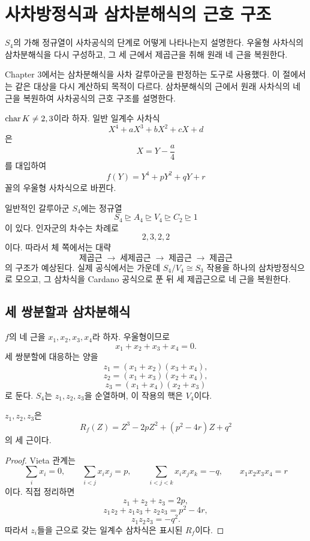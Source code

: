 \clearpage
\section{사차방정식과 삼차분해식의 근호 구조}
\label{sec:quartic-radical-structure}

\begin{learninggoal}
$S_4$의 가해 정규열이 사차공식의 단계로 어떻게 나타나는지 설명한다. 우울형 사차식의 삼차분해식을 다시 구성하고, 그 세 근에서 제곱근을 취해 원래 네 근을 복원한다.
\end{learninggoal}

Chapter 3에서는 삼차분해식을 사차 갈루아군을 판정하는 도구로 사용했다. 이 절에서는 같은 대상을 다시 계산하되 목적이 다르다. 삼차분해식의 근에서 원래 사차식의 네 근을 복원하여 사차공식의 근호 구조를 설명한다.

$\operatorname{char} K\ne2,3$이라 하자. 일반 일계수 사차식
\[
  X^4+aX^3+bX^2+cX+d
\]
은
\[
  X=Y-\frac a4
\]
를 대입하여
\[
  f(Y)=Y^4+pY^2+qY+r
\]
꼴의 우울형 사차식으로 바뀐다.

일반적인 갈루아군 $S_4$에는 정규열
\[
  S_4\trianglerighteq A_4\trianglerighteq V_4
  \trianglerighteq C_2\trianglerighteq1
\]
이 있다. 인자군의 차수는 차례로
\[
  2,3,2,2
\]
이다. 따라서 체 쪽에서는 대략
\[
  \text{제곱근}\;\longrightarrow\;
  \text{세제곱근}\;\longrightarrow\;
  \text{제곱근}\;\longrightarrow\;
  \text{제곱근}
\]
의 구조가 예상된다. 실제 공식에서는 가운데 $S_4/V_4\cong S_3$ 작용을 하나의 삼차방정식으로 모으고, 그 삼차식을 Cardano 공식으로 푼 뒤 세 제곱근으로 네 근을 복원한다.

\subsection{세 쌍분할과 삼차분해식}

$f$의 네 근을 $x_1,x_2,x_3,x_4$라 하자. 우울형이므로
\[
  x_1+x_2+x_3+x_4=0.
\]
세 쌍분할에 대응하는 양을
\[
  z_1=(x_1+x_2)(x_3+x_4),
\]
\[
  z_2=(x_1+x_3)(x_2+x_4),
\]
\[
  z_3=(x_1+x_4)(x_2+x_3)
\]
로 둔다. $S_4$는 $z_1,z_2,z_3$을 순열하며, 이 작용의 핵은 $V_4$이다.

\begin{proposition}
\label{prop:quartic-resolvent-cubic-radicals}
$z_1,z_2,z_3$은
\[
  \boxed{
  R_f(Z)=Z^3-2pZ^2+(p^2-4r)Z+q^2}
\]
의 세 근이다.
\end{proposition}

\begin{proof}
Vieta 관계는
\[
  \sum_i x_i=0,
  \qquad
  \sum_{i<j}x_ix_j=p,
  \qquad
  \sum_{i<j<k}x_ix_jx_k=-q,
  \qquad
  x_1x_2x_3x_4=r
\]
이다. 직접 정리하면
\[
  z_1+z_2+z_3=2p,
\]
\[
  z_1z_2+z_1z_3+z_2z_3=p^2-4r,
\]
\[
  z_1z_2z_3=-q^2.
\]
따라서 $z_i$들을 근으로 갖는 일계수 삼차식은 표시된 $R_f$이다.
\end{proof}

